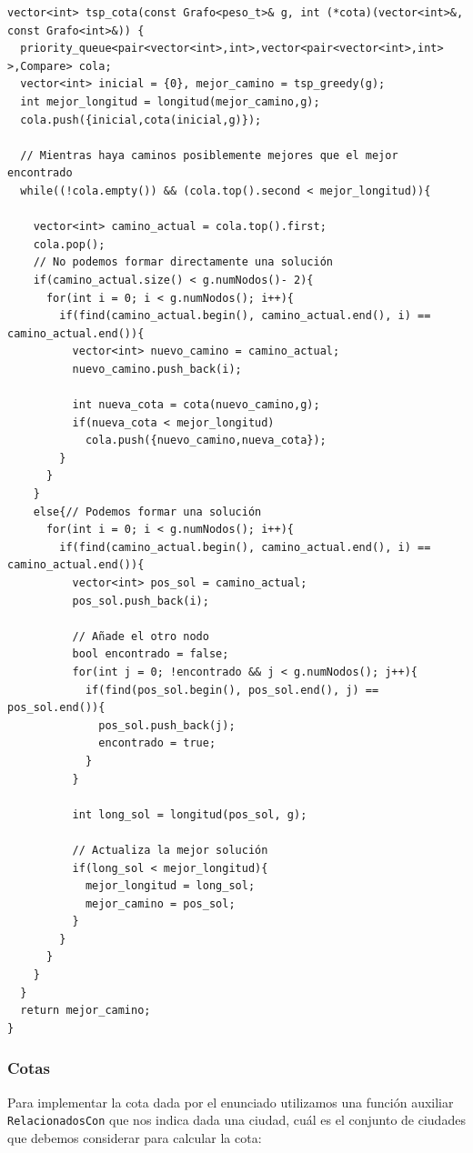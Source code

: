 \begin{lstlisting}
vector<int> tsp_cota(const Grafo<peso_t>& g, int (*cota)(vector<int>&, const Grafo<int>&)) {
  priority_queue<pair<vector<int>,int>,vector<pair<vector<int>,int> >,Compare> cola;
  vector<int> inicial = {0}, mejor_camino = tsp_greedy(g);
  int mejor_longitud = longitud(mejor_camino,g);
  cola.push({inicial,cota(inicial,g)});

  // Mientras haya caminos posiblemente mejores que el mejor encontrado
  while((!cola.empty()) && (cola.top().second < mejor_longitud)){

    vector<int> camino_actual = cola.top().first;
    cola.pop();
    // No podemos formar directamente una solución
    if(camino_actual.size() < g.numNodos()- 2){
      for(int i = 0; i < g.numNodos(); i++){
        if(find(camino_actual.begin(), camino_actual.end(), i) == camino_actual.end()){
          vector<int> nuevo_camino = camino_actual;
          nuevo_camino.push_back(i);

          int nueva_cota = cota(nuevo_camino,g);
          if(nueva_cota < mejor_longitud)
            cola.push({nuevo_camino,nueva_cota});
        }
      }
    }
    else{// Podemos formar una solución
      for(int i = 0; i < g.numNodos(); i++){
        if(find(camino_actual.begin(), camino_actual.end(), i) == camino_actual.end()){
          vector<int> pos_sol = camino_actual;
          pos_sol.push_back(i);

          // Añade el otro nodo
          bool encontrado = false;
          for(int j = 0; !encontrado && j < g.numNodos(); j++){
            if(find(pos_sol.begin(), pos_sol.end(), j) == pos_sol.end()){
              pos_sol.push_back(j);
              encontrado = true;
            }
          }

          int long_sol = longitud(pos_sol, g);

          // Actualiza la mejor solución
          if(long_sol < mejor_longitud){
            mejor_longitud = long_sol;
            mejor_camino = pos_sol;
          }
        }
      }
    }
  }
  return mejor_camino;
}
\end{lstlisting}

\subsubsection{Cotas}

Para implementar la cota dada por el enunciado utilizamos una función auxiliar \texttt{RelacionadosCon} que nos indica dada una ciudad, cuál es el conjunto de ciudades que debemos considerar para calcular la cota:

